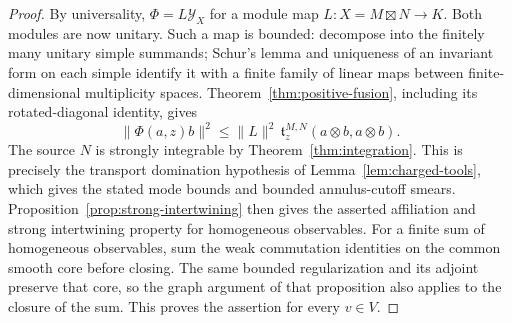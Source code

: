 \begin{proof}
By universality, $\Phi=L\mathcal Y_X$ for a module map
$L:X=M\boxtimes N\longrightarrow K$.  Both modules are now
unitary.  Such a map is bounded: decompose into the finitely many
unitary simple summands; Schur's lemma and uniqueness of an
invariant form on each simple identify it with a finite family of
linear maps between finite-dimensional multiplicity spaces.
Theorem~\ref{thm:positive-fusion}, including its rotated-diagonal
identity, gives
\[
 \|\Phi(a,z)b\|^2
 \leq\|L\|^2\,
       \mathfrak t_z^{M,N}(a\otimes b,a\otimes b).
\]
The source $N$ is strongly integrable by
Theorem~\ref{thm:integration}.  This is precisely the transport
domination hypothesis of Lemma~\ref{lem:charged-tools}, which
gives the stated mode bounds and bounded annulus-cutoff smears.
Proposition~\ref{prop:strong-intertwining} then gives the asserted
affiliation and strong intertwining property for homogeneous
observables.  For a finite sum of homogeneous observables, sum the
weak commutation identities on the common smooth core before
closing.  The same bounded regularization and its adjoint preserve
that core, so the graph argument of that proposition also applies
to the closure of the sum.  This proves the assertion for every
$v\in V$.
\end{proof}
